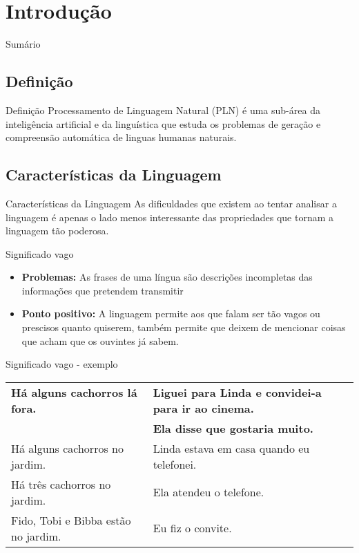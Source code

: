 \renewcommand{\titulo}{Introdução}
\section{\titulo}

\begin{frame}{Sumário}
\tableofcontents[currentsection]
\end{frame}

\renewcommand{\titulo}{Definição}
\subsection{\titulo}
\begin{frame}{\titulo}
Processamento de Linguagem Natural (PLN) é uma sub-área da inteligência artificial e da linguística que estuda os problemas de geração e compreensão automática de linguas humanas naturais.
\end{frame}


\renewcommand{\titulo}{Características da Linguagem}
\subsection{\titulo}

\begin{frame}{\titulo}
As dificuldades que existem ao tentar analisar a linguagem é apenas o lado menos interessante das propriedades que tornam a linguagem tão poderosa.
\end{frame}


\begin{frame}{Significado vago}
\begin{itemize}
\item \textbf{Problemas:} As frases de uma língua são descrições incompletas das informações que pretendem transmitir
\item \textbf{Ponto positivo:} A linguagem permite aos que falam ser tão vagos ou prescisos quanto quiserem, também permite que deixem de mencionar coisas que acham que os ouvintes já sabem.
\end{itemize}
\end{frame}

\begin{frame}{Significado vago - exemplo}
\begin{table}[!htp]
	\begin{tabular}{| p{5.25cm} | p{5.25cm} |}

		\hline \textbf{Há alguns cachorros lá fora.} & \textbf{Liguei para Linda e convidei-a para ir ao cinema.} \\ 
													 & \textbf{Ela disse que gostaria muito.} \\
		\hline Há alguns cachorros no jardim. & Linda estava em casa quando eu telefonei. \\
		\hline Há três cachorros no jardim. & Ela atendeu o telefone. \\
		\hline Fido, Tobi e Bibba estão no jardim. & Eu fiz o convite. \\
		\hline

	\end{tabular}
\end{table}
\end{frame}

